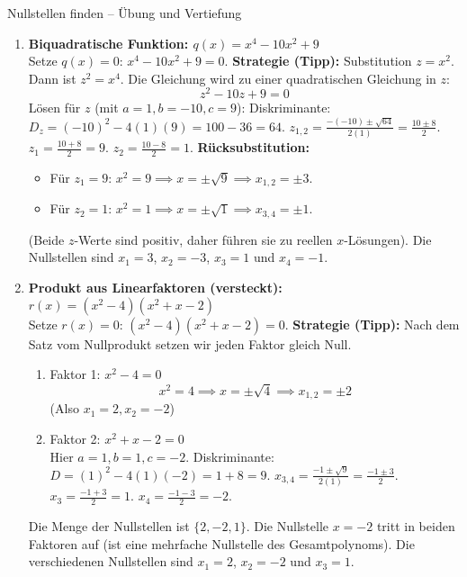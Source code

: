 \begin{loesungsumgebung}{Nullstellen finden – Übung und Vertiefung}
\begin{enumerate}[label=(\alph*)]
    \item \textbf{Biquadratische Funktion: $q(x) = x^4 - 10x^2 + 9$} \\
    Setze $q(x)=0$: $x^4 - 10x^2 + 9 = 0$.
    \textbf{Strategie (Tipp):} Substitution $z = x^2$. Dann ist $z^2 = x^4$.
    Die Gleichung wird zu einer quadratischen Gleichung in $z$:
    $$ z^2 - 10z + 9 = 0 $$
    Lösen für $z$ (mit $a=1, b=-10, c=9$):
    Diskriminante: $D_z = (-10)^2 - 4(1)(9) = 100 - 36 = 64$.
    $z_{1,2} = \frac{-(-10) \pm \sqrt{64}}{2(1)} = \frac{10 \pm 8}{2}$.
    $z_1 = \frac{10+8}{2} = 9$.
    $z_2 = \frac{10-8}{2} = 1$.
    \textbf{Rücksubstitution:}
    \begin{itemize}
        \item Für $z_1 = 9$: $x^2 = 9 \implies x = \pm\sqrt{9} \implies x_{1,2} = \pm 3$.
        \item Für $z_2 = 1$: $x^2 = 1 \implies x = \pm\sqrt{1} \implies x_{3,4} = \pm 1$.
    \end{itemize}
    (Beide $z$-Werte sind positiv, daher führen sie zu reellen $x$-Lösungen).
    Die Nullstellen sind $x_1=3$, $x_2=-3$, $x_3=1$ und $x_4=-1$.

    \item \textbf{Produkt aus Linearfaktoren (versteckt): $r(x) = (x^2-4)(x^2+x-2)$} \\
    Setze $r(x)=0$: $(x^2-4)(x^2+x-2) = 0$.
    \textbf{Strategie (Tipp):} Nach dem Satz vom Nullprodukt setzen wir jeden Faktor gleich Null.
    \begin{enumerate}
        \item Faktor 1: $x^2-4 = 0$
            $$ x^2 = 4 \implies x = \pm\sqrt{4} \implies x_{1,2} = \pm 2 $$
            (Also $x_1=2, x_2=-2$)
        \item Faktor 2: $x^2+x-2 = 0$ \\
            Hier $a=1, b=1, c=-2$.
            Diskriminante: $D = (1)^2 - 4(1)(-2) = 1 + 8 = 9$.
            $x_{3,4} = \frac{-1 \pm \sqrt{9}}{2(1)} = \frac{-1 \pm 3}{2}$.
            $x_3 = \frac{-1+3}{2} = 1$.
            $x_4 = \frac{-1-3}{2} = -2$.
    \end{enumerate}
    Die Menge der Nullstellen ist $\{2, -2, 1\}$. Die Nullstelle $x=-2$ tritt in beiden Faktoren auf (ist eine mehrfache Nullstelle des Gesamtpolynoms). Die verschiedenen Nullstellen sind $x_1=2$, $x_2=-2$ und $x_3=1$.


\end{enumerate}
\end{loesungsumgebung}
